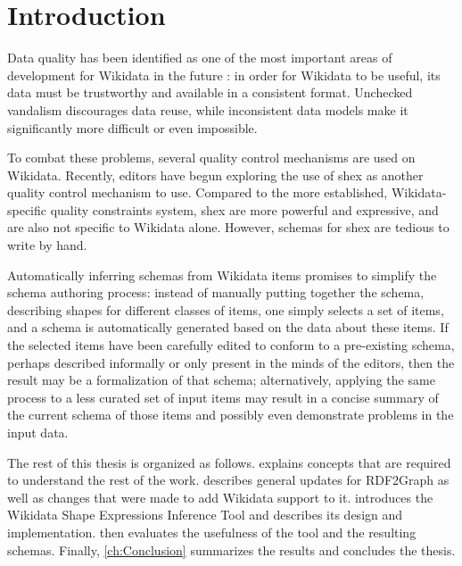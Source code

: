 
\chapter{Introduction}
\label{ch:Introduction}

Data quality has been identified as one of the most important areas of development for Wikidata in the future \cite{wdcon2017-sotp}: %
in order for Wikidata to be useful,
its data must be trustworthy and available in a consistent format.
Unchecked vandalism discourages data reuse,
while inconsistent data models make it significantly more difficult or even impossible.

To combat these problems,
several quality control mechanisms are used on Wikidata.
Recently, editors have begun exploring the use of \acrlong{shex}
as another quality control mechanism to use.
Compared to the more established, Wikidata-specific quality constraints system,
\acrlong{shex} are more powerful and expressive,
and are also not specific to Wikidata alone.
However, schemas for \acrlong{shex} are tedious to write by hand.

Automatically inferring schemas from Wikidata items
promises to simplify the schema authoring process:
instead of manually putting together the schema,
describing shapes for different classes of items,
one simply selects a set of items,
and a schema is automatically generated based on the data about these items.
If the selected items have been carefully edited
to conform to a pre-existing schema,
perhaps described informally or only present in the minds of the editors,
then the result may be a formalization of that schema;
alternatively, applying the same process to a less curated set of input items
may result in a concise summary of the current schema of those items %
and possibly even demonstrate problems in the input data.


The rest of this thesis %
is organized as follows.
 explains concepts that are required
to understand the rest of the work. %
 describes general updates for RDF2Graph
as well as changes that were made to add Wikidata support to it.
 introduces the Wikidata Shape Expressions Inference Tool
and describes its design and implementation.
 then evaluates the usefulness of the tool and the resulting schemas.
Finally, \cref{ch:Conclusion} summarizes the results and concludes the thesis.

